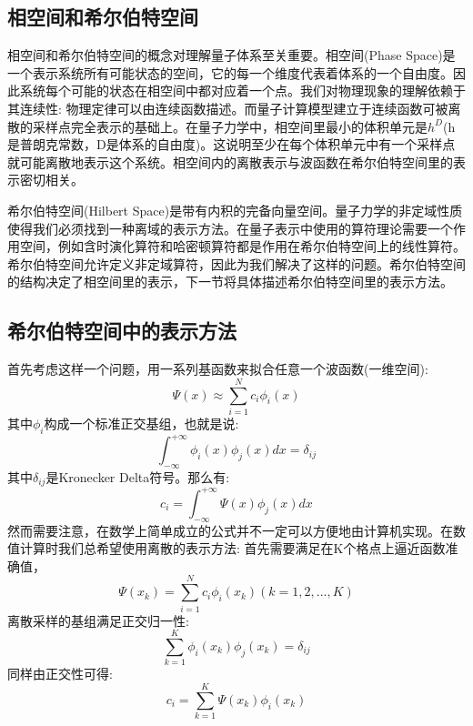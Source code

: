 
\subsection{相空间和希尔伯特空间}
相空间和希尔伯特空间的概念对理解量子体系至关重要。相空间(Phase Space)是一个表示系统所有可能状态的空间，它的每一个维度代表着体系的一个自由度。因此系统每个可能的状态在相空间中都对应着一个点。我们对物理现象的理解依赖于其连续性: 物理定律可以由连续函数描述。而量子计算模型建立于连续函数可被离散的采样点完全表示的基础上。在量子力学中，相空间里最小的体积单元是$ h^{D} $(h是普朗克常数，D是体系的自由度)。这说明至少在每个体积单元中有一个采样点就可能离散地表示这个系统。相空间内的离散表示与波函数在希尔伯特空间里的表示密切相关。

希尔伯特空间(Hilbert Space)是带有内积的完备向量空间。量子力学的非定域性质使得我们必须找到一种离域的表示方法。在量子表示中使用的算符理论需要一个作用空间，例如含时演化算符和哈密顿算符都是作用在希尔伯特空间上的线性算符。希尔伯特空间允许定义非定域算符，因此为我们解决了这样的问题。希尔伯特空间的结构决定了相空间里的表示，下一节将具体描述希尔伯特空间里的表示方法。

\subsection{希尔伯特空间中的表示方法}
首先考虑这样一个问题，用一系列基函数来拟合任意一个波函数(一维空间):
\begin{equation}
  \Psi (x) \approx \sum_{i=1}^N c_i \phi_i (x)
\end{equation}
其中$\phi_i$构成一个标准正交基组，也就是说:
\begin{equation}
  \int_{-\infty}^{+\infty} \phi_i(x) \phi_j(x) dx = \delta_{ij}
\end{equation}
其中$\delta_{ij}$是Kronecker Delta符号。那么有:
\begin{equation}
  c_i = \int_{-\infty}^{+\infty} \Psi(x) \phi_j(x) dx
\end{equation}
然而需要注意，在数学上简单成立的公式并不一定可以方便地由计算机实现。在数值计算时我们总希望使用离散的表示方法: 首先需要满足在K个格点上逼近函数准确值，
\begin{equation}
  \Psi(x_k) = \sum_{i=1}^{N} c_i \phi_i(x_k) (k=1,2,...,K)
\end{equation}
离散采样的基组满足正交归一性:
\begin{equation}
  \sum_{k=1}^{K} \phi_i(x_k) \phi_j(x_k) = \delta_{ij}
\end{equation}
同样由正交性可得:
\begin{equation}
  c_i = \sum_{k=1}^{K} \Psi(x_k) \phi_i(x_k)
\end{equation}

